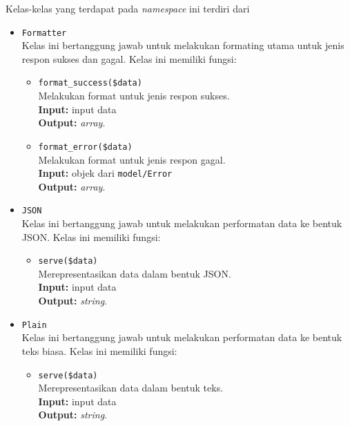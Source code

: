     Kelas-kelas yang terdapat pada \textit{namespace} ini terdiri dari
    \begin{itemize}
        \item \texttt{Formatter} \\
            Kelas ini bertanggung jawab untuk melakukan formating utama untuk jenis respon sukses
            dan gagal.
            Kelas ini memiliki fungsi:
            \begin{itemize}
                \item \texttt{format\_success(\$data)} \\
                    Melakukan format untuk jenis respon sukses.\\
                    \textbf{Input:} input data\\
                    \textbf{Output:} \textit{array}.
                    
                \item \texttt{format\_error(\$data)} \\
                    Melakukan format untuk jenis respon gagal.\\
                    \textbf{Input:} objek dari \texttt{model/Error}\\
                    \textbf{Output:} \textit{array}.
            \end{itemize}
            
        \item \texttt{JSON} \\
            Kelas ini bertanggung jawab untuk melakukan performatan data ke bentuk JSON.
            Kelas ini memiliki fungsi:
            \begin{itemize}
                \item \texttt{serve(\$data)} \\
                    Merepresentasikan data dalam bentuk JSON.\\
                    \textbf{Input:} input data\\
                    \textbf{Output:} \textit{string}.
            \end{itemize}
            
        \item \texttt{Plain} \\
            Kelas ini bertanggung jawab untuk melakukan performatan data ke bentuk teks biasa.
            Kelas ini memiliki fungsi:
            \begin{itemize}
                \item \texttt{serve(\$data)} \\
                    Merepresentasikan data dalam bentuk teks.\\
                    \textbf{Input:} input data\\
                    \textbf{Output:} \textit{string}.
            \end{itemize}
            

\end{itemize}
